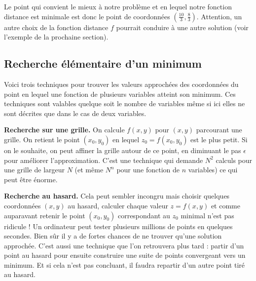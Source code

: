 \documentclass[11pt,class=report,crop=false]{standalone}
\begin{document}
\begin{exemple}

Le point qui convient le mieux à notre problème et en lequel notre fonction distance est minimale est donc le point de coordonnées $(\frac{10}{3},\frac83)$. Attention, un autre choix de la fonction distance $f$ pourrait conduire à une autre solution (voir l'exemple de la prochaine section).



\end{exemple}

\subsection{Recherche élémentaire d'un minimum}


Voici trois techniques pour trouver les valeurs approchées des coordonnées du point en lequel une fonction de plusieurs variables atteint son minimum. Ces techniques sont valables quelque soit le nombre de variables même si ici elles ne sont décrites que dans le cas de deux variables. 

\textbf{Recherche sur une grille.} On calcule $f(x,y)$ pour $(x,y)$ parcourant une grille. On retient le point $(x_0,y_0)$ en lequel $z_0=f(x_0,y_0)$ est le plus petit. Si on le souhaite, on peut affiner la grille autour de ce point, en diminuant le pas $\epsilon$ pour améliorer l'approximation. C'est une technique qui demande $N^2$ calculs pour une grille de largeur $N$ (et même $N^n$ pour une fonction de $n$ variables) ce qui peut être énorme.



\textbf{Recherche au hasard.} Cela peut sembler incongru mais choisir quelques coordonnées $(x,y)$ au hasard, calculer chaque valeur $z=f(x,y)$ et comme auparavant retenir le point $(x_0,y_0)$ correspondant au $z_0$ minimal n'est pas ridicule !
Un ordinateur peut tester plusieurs millions de points en quelques secondes. Bien sûr il y a de fortes chances de ne trouver qu'une solution approchée. C'est aussi une technique que l'on retrouvera plus tard : partir d'un point au hasard pour ensuite construire une suite de points convergeant vers un minimum. Et si cela n'est pas concluant, il faudra repartir d'un autre point tiré au hasard.
\end{document}
